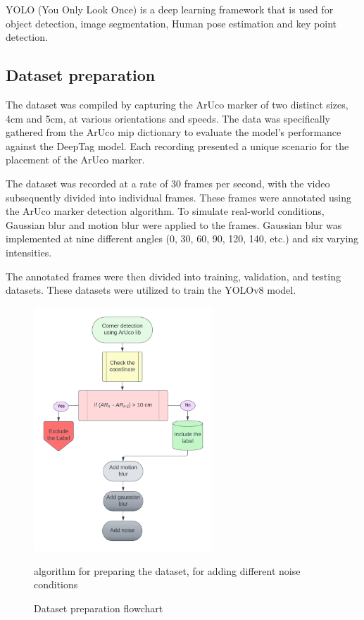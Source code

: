 \documentclass[12pt, twoside]{report}
\begin{document}
YOLO (You Only Look Once) is a deep learning framework that is used for object detection, image segmentation, Human pose estimation and key point detection.


\subsection{Dataset preparation}

The dataset was compiled by capturing the ArUco marker of two distinct sizes, 
4cm and 5cm, at various orientations and speeds. The data was specifically 
gathered from the ArUco mip dictionary to evaluate the model’s performance 
against the DeepTag model. Each recording presented a unique scenario for 
the placement of the ArUco marker.

The dataset was recorded at a rate of 30 frames per second, with the video 
subsequently divided into individual frames. These frames were annotated 
using the ArUco marker detection algorithm. To simulate real-world 
conditions, Gaussian blur and motion blur were applied to the frames. 
Gaussian blur was implemented at nine different angles (0, 30, 60, 90, 120, 
140, etc.) and six varying intensities.

The annotated frames were then divided into training, validation, 
and testing datasets. These datasets were utilized to train the YOLOv8 model.

\begin{figure}
    \centering
    \includegraphics[width=0.6\textwidth]{m_dataset_prep.png}
    \caption{Dataset preparation flowchart}
    {algorithm for preparing the dataset, for adding different noise conditions}
    \label{fig:dataset}
\end{figure}
\end{document}
